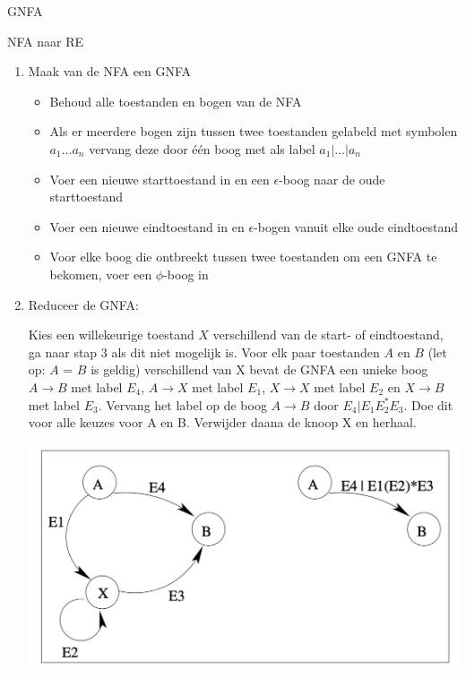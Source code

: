 \begin{theo}[GNFA]{GNFA}
\begin{minipage}{.4\textwidth}
    \end{minipage}
\end{theo}

\begin{alg}[NFA $\to$ RE]{NFA naar RE}
    \begin{enumerate}
        \item Maak van de NFA een GNFA
        \begin{itemize}
            \item Behoud alle toestanden en bogen van de NFA
            \item Als er meerdere bogen zijn tussen twee toestanden gelabeld met symbolen \(a_{1} \ldots a_{n} \) vervang deze door één boog met als label \(a_{1} | \ldots | a_{n} \)
            \item Voer een nieuwe starttoestand in en een \(\epsilon\)-boog naar de oude starttoestand
            \item Voer een nieuwe eindtoestand in en \(\epsilon\)-bogen vanuit elke oude eindtoestand
            \item Voor elke boog die ontbreekt tussen twee toestanden om een GNFA te bekomen, voer een \(\phi\)-boog in
        \end{itemize}
        \item Reduceer de GNFA: \vspace{0.3cm} \\
            \begin{minipage}{.43\textwidth} 
                Kies een willekeurige toestand \(X\) verschillend van de start- of eindtoestand, ga naar stap 3 als dit niet mogelijk is.
                Voor elk paar toestanden \(A\) en \(B\) (let op: \(A\) = \(B\) is geldig) verschillend van X bevat de GNFA een unieke boog \(A \to B\) met label \(E_{4}\), 
                \(A \to X\) met label \(E_{1}\), \(X \to X\) met label \(E_{2}\) en \(X \to B\) met label \(E_{3}\). Vervang het label op de boog \(A \to B\) door \(E_{4} | E_{1}E_{2}^{*}E_{3}\).
                Doe dit voor alle keuzes voor A en B. Verwijder daana de knoop X en herhaal.
            \end{minipage}
            \begin{minipage}{.53\textwidth}
                \includegraphics[scale = 0.425]{Images/GNFAToestandVerwijderen}

\end{minipage}
\end{enumerate}
\end{alg}
